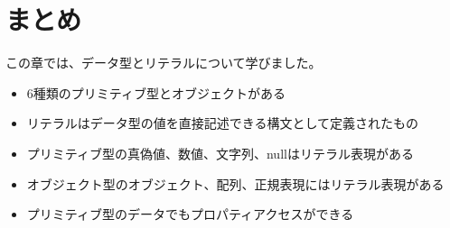 \hypertarget{data-type-summary}{%
\section{まとめ}\label{data-type-summary}}

この章では、データ型とリテラルについて学びました。

\begin{itemize}
\item
  6種類のプリミティブ型とオブジェクトがある
\item
  リテラルはデータ型の値を直接記述できる構文として定義されたもの
\item
  プリミティブ型の真偽値、数値、文字列、nullはリテラル表現がある
\item
  オブジェクト型のオブジェクト、配列、正規表現にはリテラル表現がある
\item
  プリミティブ型のデータでもプロパティアクセスができる
\end{itemize}
